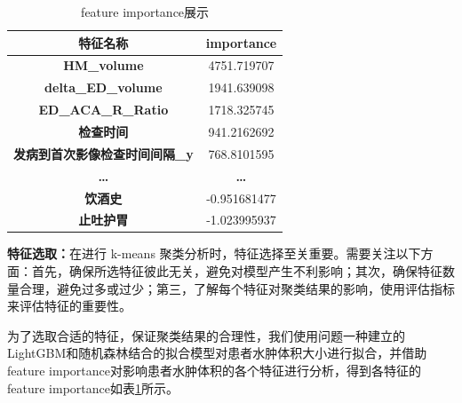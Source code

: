 \documentclass[bwprint]{gmcmthesis}
\begin{document}
\begin{table}[ht]
\centering
\caption{feature importance展示}
\label{tab:importance_b}
\fontsize{11}{9}\selectfont
\renewcommand\tabcolsep{6pt}
{
\begin{tabular}{cc}
\toprule[1.2pt]
\textbf{特征名称}              & \textbf{importance} \\ \hline
\textbf{HM\_volume}        & 4751.719707         \\
\textbf{delta\_ED\_volume} & 1941.639098         \\
\textbf{ED\_ACA\_R\_Ratio} & 1718.325745         \\
\textbf{检查时间}              & 941.2162692         \\
\textbf{发病到首次影像检查时间间隔\_y}  & 768.8101595         \\
\textbf{…}                 & \textbf{…}          \\
\textbf{饮酒史}               & -0.951681477        \\
\textbf{止吐护胃}              & -1.023995937        \\ \bottomrule[1.2pt]
\end{tabular}}
\end{table}

{\bf 特征选取：}在进行 k-means 聚类分析时，特征选择至关重要。需要关注以下方面：首先，确保所选特征彼此无关，避免对模型产生不利影响；其次，确保特征数量合理，避免过多或过少；第三，了解每个特征对聚类结果的影响，使用评估指标来评估特征的重要性。

为了选取合适的特征，保证聚类结果的合理性，我们使用问题一种建立的LightGBM和随机森林结合的拟合模型对患者水肿体积大小进行拟合，并借助feature importance对影响患者水肿体积的各个特征进行分析，得到各特征的feature importance如表\ref{tab:importance_b}所示。
\end{document}
